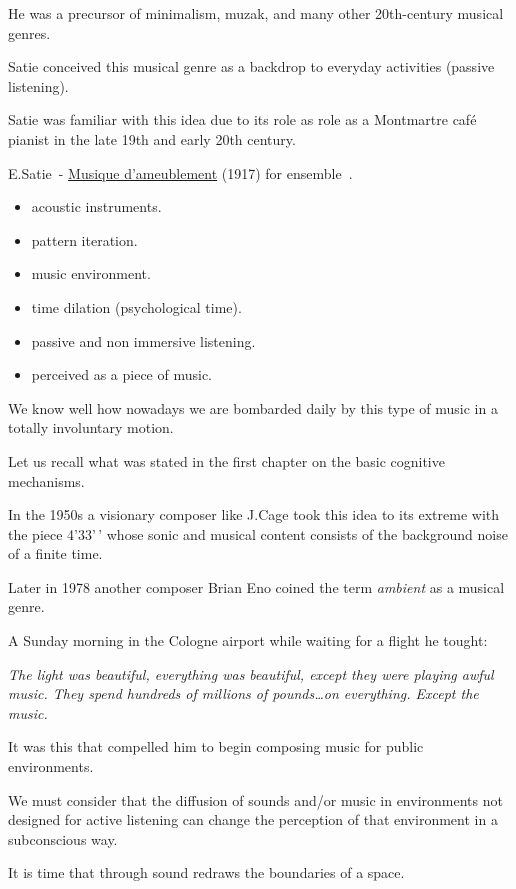 He was a precursor of minimalism, muzak, and many other 20th-century musical genres.

Satie conceived this musical genre as a backdrop to everyday activities (passive listening).

Satie was familiar with this idea due to its role as role as a Montmartre café pianist in the late 19th and early 20th century.

E.Satie~- \href{http://www.musicaecodice.it/on_server/media/2_media/satie.mp3}{Musique d'ameublement} (1917) for ensemble~\cite{satie}.

\begin{itemize}
\tightlist\item acoustic instruments.
\item pattern iteration.
\item music environment.
\item time dilation (psychological time).
\item passive and non immersive listening.
\item perceived as a piece of music.
\end{itemize}

We know well how nowadays we are bombarded daily by this type of music in a totally involuntary motion.

Let us recall what was stated in the first chapter on the basic cognitive mechanisms.

In the 1950s a visionary composer like J.Cage took this idea to its extreme with the piece 4'33'\,' whose sonic and musical content consists of the background noise of a finite time.

Later in 1978 another composer Brian Eno coined the term \textit{ambient} as a musical genre.

A Sunday morning in the Cologne airport while waiting for a flight he tought: 

\textit{The light was beautiful, everything was beautiful, except they were playing awful music. They spend hundreds of millions of pounds\ldots on everything. Except the music.}

It was this that compelled him to begin composing music for public environments.

We must consider that the diffusion of sounds and/or music in environments not designed for active listening can change the perception of that environment in a subconscious way.

It is time that through sound redraws the boundaries of a space.

